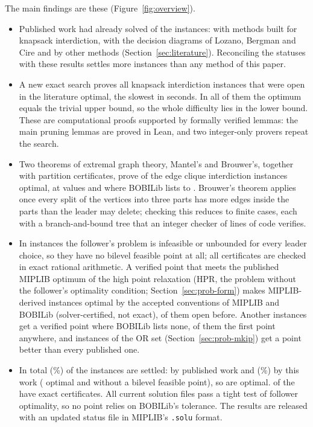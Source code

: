 \documentclass[]{spie}  %
\theoremstyle{plain}
\newcommand{\code}[1]{\texttt{#1}}
\begin{document}
The main findings are these (Figure~\ref{fig:overview}).
\begin{itemize}
\item Published work had already solved \NumLitOptimal{} of the \NumUnsolved{} instances:
\NumLitKnapsackMethods{} with methods built for knapsack
interdiction,\cite{caprara2016bilevel,fischetti2016monotonicity,weninger_bkpsolver,fischetti2019interdiction}
\NumLitLozano{} with the
decision diagrams of Lozano, Bergman and Cire\cite{lozano2026network} and \NumLitOther{} by other
methods (Section~\ref{sec:literature}). Reconciling the statuses with these results settles more instances
than any method of this paper.
\item A new exact search proves all \NumNewKip{} knapsack interdiction instances that were open
in the literature optimal, the slowest in \KipHardestCpu{} seconds. In all of them the optimum
equals the trivial upper bound, so the whole difficulty lies in the lower bound. These are
computational proofs supported by formally verified lemmas: the main pruning lemmas are proved
in Lean, and two integer-only provers repeat the search.
\item Two theorems of extremal graph theory, Mantel's and Brouwer's, together with partition
certificates, prove \NumNewClique{} of the \NumCliqueSet{} edge clique interdiction instances
optimal, at values \CliqueOptSeven{} and \CliqueOptNine{} where BOBILib lists \CliqueBobiMin{} to
\CliqueBobiMax{}. Brouwer's theorem applies once every split of the vertices into three parts
has more edges inside the parts than the leader may delete; checking this reduces to \NumCliquePartCases{} finite
cases, each with a branch-and-bound tree that an integer checker of \CliqueCheckerLines{} lines of
code verifies.
\item In \NumNoFeasible{} instances the follower's problem is infeasible or unbounded for every
leader choice, so they have no bilevel feasible point at all; all \NumRayExact{} certificates are
checked in exact rational arithmetic. A verified point that meets the published MIPLIB optimum of
the high point relaxation (HPR, the problem without the follower's optimality condition;
Section~\ref{sec:prob-form}) makes \NumHprOptimal{} MIPLIB-derived instances optimal by the
accepted conventions of MIPLIB and BOBILib (solver-certified, not exact), \NumHprOpen{} of them open
before. Another \NumFirstPoint{} instances get a verified point where BOBILib lists none,
\NumFirstAnywhere{} of them the first point anywhere, and \NumOrBetter{} instances of the OR set
(Section~\ref{sec:prob-mkip}) get a point better than every published one.
\item In total \NumSettled{} (\PctSettled\%) of the \NumUnsolved{} instances are settled:
\NumLitOptimal{} by published work and \NumSettledHere{} (\PctSettledHere\%) by this work
(\NumNewOptimal{} optimal and \NumNoFeasible{} without a bilevel feasible point), so
\NumOptimalNow{} are optimal. \NumClassExactSettled{} of the \NumSettledHere{} have exact
certificates. All \NumTightFiles{} current solution files pass a tight test of follower optimality,
so no point relies on BOBILib's tolerance. The results are released with an updated status file in
MIPLIB's \code{.solu} format.
\end{itemize}
\end{document}
